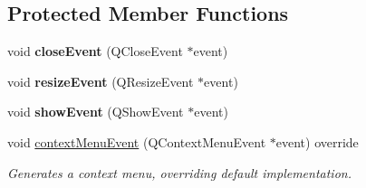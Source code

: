 \subsection*{Protected Member Functions}
\begin{DoxyCompactItemize}
\item 
\mbox{\label{classrev_1_1_main_window_a9916d8570e8f669240213e5090173cb6}} 
void {\bfseries close\+Event} (Q\+Close\+Event $\ast$event)
\item 
\mbox{\label{classrev_1_1_main_window_a7888e2ee862ac186661a4c3e231adefe}} 
void {\bfseries resize\+Event} (Q\+Resize\+Event $\ast$event)
\item 
\mbox{\label{classrev_1_1_main_window_aa906fdc1c8a7f4883a1d98585fb22eff}} 
void {\bfseries show\+Event} (Q\+Show\+Event $\ast$event)
\item 
void \mbox{\hyperlink{classrev_1_1_main_window_a122fc9956c6d65e28bb9140343b02655}{context\+Menu\+Event}} (Q\+Context\+Menu\+Event $\ast$event) override
\begin{DoxyCompactList}\small\item\em Generates a context menu, overriding default implementation. \end{DoxyCompactList}\end{DoxyCompactItemize}
